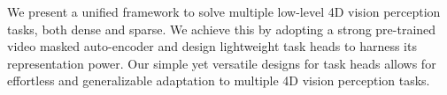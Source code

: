 We present a unified framework to solve multiple low-level 4D vision perception tasks, both dense and sparse.
We achieve this by adopting a strong pre-trained video masked auto-encoder and design lightweight task heads to harness its representation power.
Our simple yet versatile designs for task heads allows for effortless and generalizable adaptation to multiple 4D vision perception tasks.